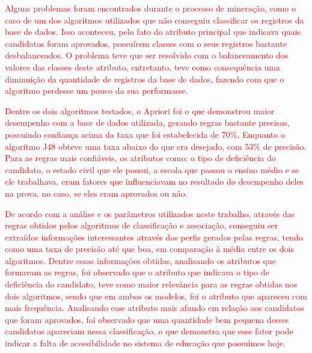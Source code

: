 \par
\textcolor{red}{Alguns problemas foram encontrados durante o processo de mineração, como o caso de um dos algoritmos utilizados que não conseguiu classificar os registros da base de dados.  Isso aconteceu, pelo fato do atributo principal que indicava quais candidatos foram aprovados, possuírem classes com o seus registros bastante desbalanceados. O problema teve que ser resolvido com o balanceamento dos valores das classes deste atributo, entretanto, teve como consequência uma diminuição da quantidade de registros da base de dados, fazendo com que o algoritmo perdesse um pouco da sua performasse.}  

\par
\textcolor{red}{Dentre os dois algoritmos testados, o Apriori foi o que demonstrou maior desempenho com a base de dados utilizada, gerando regras bastante precisas, possuindo confiança acima da taxa que foi estabelecida de 70\%. Enquanto o algoritmo J48 obteve uma taxa abaixo do que era desejado, com 53\% de precisão. Para as regras mais confiáveis, os atributos como: o tipo de deficiência do candidato, o estado civil que ele possui, a escola que passou o ensino médio e se ele trabalhava, eram fatores que influenciavam no resultado do desempenho deles na prova, no caso, se eles eram aprovados ou não.}   

\par
\textcolor{red}{De acordo com a análise e os parâmetros utilizados neste trabalho, através das regras obtidos pelos algoritmos de classificação e associação, conseguiu ser extraídos informações interessantes através dos perfis gerados pelas regras, tendo como uma taxa de precisão até que boa, em comparação à média entre os dois algoritmos. Dentre essas informações obtidas, analisando os atributos que formavam as regras, foi observado que o atributo que indicava o tipo de deficiência do candidato, teve como maior relevância para as regras obtidas nos dois algoritmos, sendo que em ambos os modelos, foi o atributo que apareceu com mais frequência. Analisando esse atributo mais afundo em relação aos candidatos que foram aprovados, foi observado que uma quantidade bem pequena desses candidatos apareciam nessa classificação, o que demonstra que esse fator pode indicar a falta de acessibilidade no sistema de educação que possuímos hoje.}



